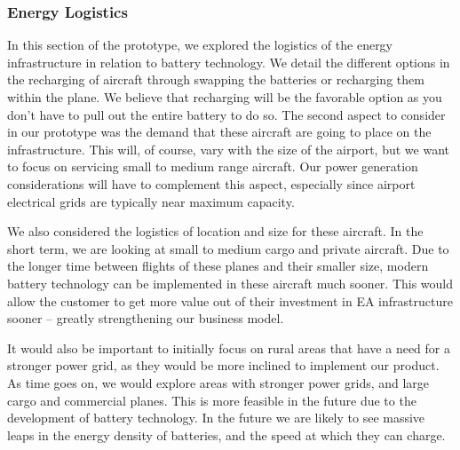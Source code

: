 \documentclass[../main.tex]{subfiles}
\begin{document}
\subsubsection{Energy Logistics}
In this section of the prototype, we explored the logistics of the energy infrastructure in relation to battery technology. We detail the different options in the recharging of aircraft through swapping the batteries or recharging them within the plane. We believe that recharging will be the favorable option as you don't have to pull out the entire battery to do so. The second aspect to consider in our prototype was the demand that these aircraft are going to place on the infrastructure. This will, of course, vary with the size of the airport, but we want to focus on servicing small to medium range aircraft. Our power generation considerations will have to complement this aspect, especially since airport electrical grids are typically near maximum capacity.\par
We also considered the logistics of location and size for these aircraft. In the short term, we are looking at small to medium cargo and private aircraft. Due to the longer time between flights of these planes and their smaller size, modern battery technology can be implemented in these aircraft much sooner. This would allow the customer to get more value out of their investment in EA infrastructure sooner -- greatly strengthening our business model.\par
It would also be important to initially focus on rural areas that have a need for a stronger power grid, as they would be more inclined to implement our product. As time goes on, we would explore areas with stronger power grids, and large cargo and commercial planes. This is more feasible in the future due to the development of battery technology. In the future we are likely to see massive leaps in the energy density of batteries, and the speed at which they can charge. 

\newpage
\end{document}
